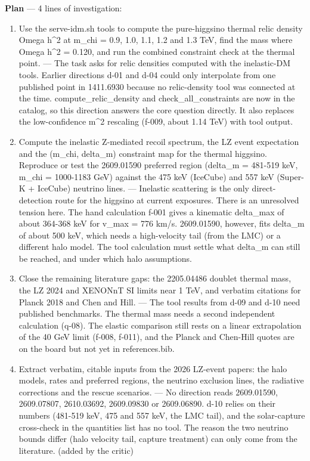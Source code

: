 \documentclass[11pt,a4paper]{article}
\begin{document}
\textbf{Plan} --- 4 lines of investigation:

\begin{enumerate}
  \item Use the serve-idm.sh tools to compute the pure-higgsino thermal relic density Omega h\textasciicircum{}2 at m\_chi = 0.9, 1.0, 1.1, 1.2 and 1.3 TeV, find the mass where Omega h\textasciicircum{}2 = 0.120, and run the combined constraint check at the thermal point. --- The task asks for relic densities computed with the inelastic-DM tools. Earlier directions d-01 and d-04 could only interpolate from one published point in 1411.6930 because no relic-density tool was connected at the time. compute\_relic\_density and check\_all\_constraints are now in the catalog, so this direction answers the core question directly. It also replaces the low-confidence m\textasciicircum{}2 rescaling (f-009, about 1.14 TeV) with tool output.
  \item Compute the inelastic Z-mediated recoil spectrum, the LZ event expectation and the (m\_chi, delta\_m) constraint map for the thermal higgsino. Reproduce or test the 2609.01590 preferred region (delta\_m = 481-519 keV, m\_chi = 1000-1183 GeV) against the 475 keV (IceCube) and 557 keV (Super-K + IceCube) neutrino lines. --- Inelastic scattering is the only direct-detection route for the higgsino at current exposures. There is an unresolved tension here. The hand calculation f-001 gives a kinematic delta\_max of about 364-368 keV for v\_max = 776 km/s. 2609.01590, however, fits delta\_m of about 500 keV, which needs a high-velocity tail (from the LMC) or a different halo model. The tool calculation must settle what delta\_m can still be reached, and under which halo assumptions.
  \item Close the remaining literature gaps: the 2205.04486 doublet thermal mass, the LZ 2024 and XENONnT SI limits near 1 TeV, and verbatim citations for Planck 2018 and Chen and Hill. --- The tool results from d-09 and d-10 need published benchmarks. The thermal mass needs a second independent calculation (q-08). The elastic comparison still rests on a linear extrapolation of the 40 GeV limit (f-008, f-011), and the Planck and Chen-Hill quotes are on the board but not yet in references.bib.
  \item Extract verbatim, citable inputs from the 2026 LZ-event papers: the halo models, rates and preferred regions, the neutrino exclusion lines, the radiative corrections and the rescue scenarios. --- No direction reads 2609.01590, 2609.07807, 2610.03692, 2609.09830 or 2609.06890. d-10 relies on their numbers (481-519 keV, 475 and 557 keV, the LMC tail), and the solar-capture cross-check in the quantities list has no tool. The reason the two neutrino bounds differ (halo velocity tail, capture treatment) can only come from the literature. (added by the critic)

\end{enumerate}
\end{document}
